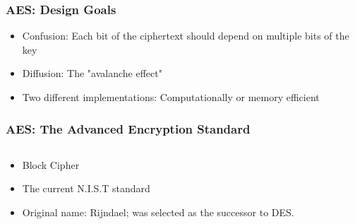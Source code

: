 \documentclass[12pt]{beamer}
\begin{document}
\begin{frame}
\frametitle{AES: Design Goals}
\begin{itemize}
\item Confusion: Each bit of the ciphertext should depend on multiple bits of the key
\item Diffusion: The "avalanche effect"
\item Two different implementations: Computationally or memory efficient
\end{itemize}
\end{frame}

\begin{frame}
\frametitle{AES: The Advanced Encryption Standard}
\begin{columns}
\begin{column}{0.5\textwidth}
\begin{itemize}
\item Block Cipher
\item The current N.I.S.T standard
\item Original name: Rijndael; was selected as the successor to DES.
\end{itemize}
\end{column}
\begin{column}{0.5\textwidth}
\begin{center}
\end{center}
\end{column}
\end{columns}
\end{frame}
\end{document}
